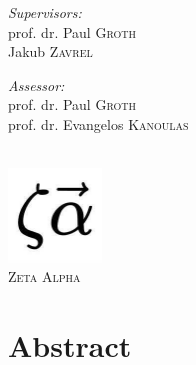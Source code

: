 \documentclass[12pt]{extreport}
\begin{document}
\begin{titlepage}
\noindent
\begin{minipage}[t]{0.4\textwidth}
\begin{flushleft} \large
\emph{Supervisors:} \\
prof. dr. Paul \textsc{Groth}\\
Jakub \textsc{Zavrel}
\end{flushleft}
\end{minipage}
\begin{minipage}[t]{0.4\textwidth}
\begin{flushright} \large
\emph{Assessor:} \\
prof. dr. Paul \textsc{Groth}\\
prof. dr. Evangelos \textsc{Kanoulas}
\end{flushright}
\end{minipage}\\[2cm]


\includegraphics[width=2.5cm]{assets/logos/zeta-alpha-logo.jpg}\\ %
\textsc{\large Zeta Alpha}\\[1.0cm] %
 

\vfill %

\end{titlepage}

\chapter*{Abstract}
\end{document}
